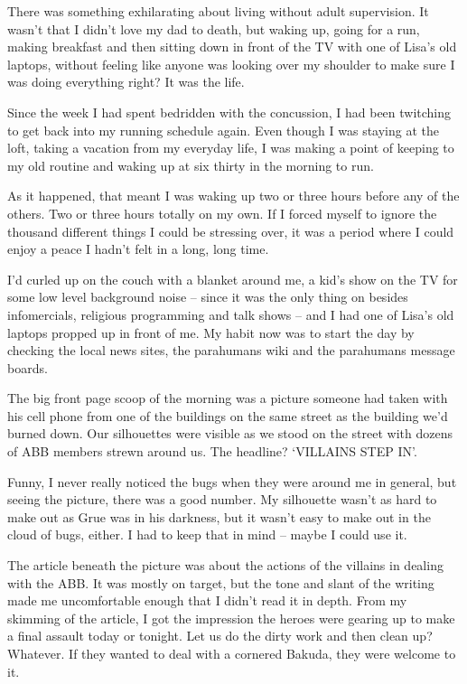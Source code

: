 





There was something exhilarating about living without adult supervision.  It wasn't that I didn't love my dad to death, but waking up, going for a run, making breakfast and then sitting down in front of the TV with one of Lisa's old laptops, without feeling like anyone was looking over my shoulder to make sure I was doing everything right?  It was the life.



Since the week I had spent bedridden with the concussion, I had been twitching to get back into my running schedule again.  Even though I was staying at the loft, taking a vacation from my everyday life, I was making a point of keeping to my old routine and waking up at six thirty in the morning to run.



As it happened, that meant I was waking up two or three hours before any of the others.  Two or three hours totally on my own.  If I forced myself to ignore the thousand different things I could be stressing over, it was a period where I could enjoy a peace I hadn't felt in a long, long time.



I'd curled up on the couch with a blanket around me, a kid's show on the TV for some low level background noise – since it was the only thing on besides infomercials, religious programming and talk shows – and I had one of Lisa's old laptops propped up in front of me.  My habit now was to start the day by checking the local news sites, the parahumans wiki and the parahumans message boards.



The big front page scoop of the morning was a picture someone had taken with his cell phone from one of the buildings on the same street as the building we'd burned down.  Our silhouettes were visible as we stood on the street with dozens of ABB members strewn around us.  The headline? `VILLAINS STEP IN'.



Funny, I never really noticed the bugs when they were around me in general, but seeing the picture, there was a good number.  My silhouette wasn't as hard to make out as Grue was in his darkness, but it wasn't easy to make out in the cloud of bugs, either.  I had to keep that in mind – maybe I could use it.



The article beneath the picture was about the actions of the villains in dealing with the ABB.  It was mostly on target, but the tone and slant of the writing made me uncomfortable enough that I didn't read it in depth.  From my skimming of the article, I got the impression the heroes were gearing up to make a final assault today or tonight.  Let us do the dirty work and then clean up?  Whatever.  If they wanted to deal with a cornered Bakuda, they were welcome to it.



